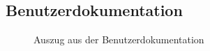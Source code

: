 \subsection{Benutzerdokumentation}
\label{subsec:Wiki}

\begin{figure}[htb]
\centering
{}
\caption{Auszug aus der Benutzerdokumentation}
\end{figure}
